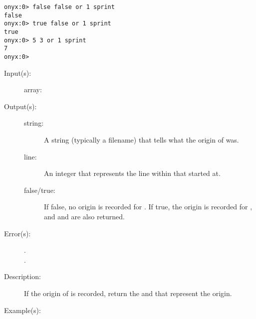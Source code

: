 \begin{description}
\begin{description}
\begin{verbatim}
onyx:0> false false or 1 sprint
false
onyx:0> true false or 1 sprint
true
onyx:0> 5 3 or 1 sprint
7
onyx:0>
		\end{verbatim}
	\end{description}
\label{systemdict:origin}
\item[{\onyxop{array}{origin}{false}}: ]
\item[{\onyxop{array}{origin}{string line true}}: ]
	\begin{description}\item[]
	\item[Input(s): ]
		\begin{description}\item[]
		\item[array: ]
		\end{description}
	\item[Output(s): ]
		\begin{description}\item[]
		\item[string: ]
			A string (typically a filename) that tells what the
			origin of  was.
		\item[line: ]
			An integer that represents the line within
			 that  started at.
		\item[false/true: ]
			If false, no origin is recorded for .  If
			true, the origin is recorded for , and
			 and  are also returned.
		\end{description}
	\item[Error(s): ]
		\begin{description}\item[]
		\item[.]
		\item[.]
		\end{description}
	\item[Description: ]
		If the origin of  is recorded, return the
		 and  that represent the origin.
	\item[Example(s): ]\begin{verbatim}


\end{verbatim}
\end{description}
\end{description}
